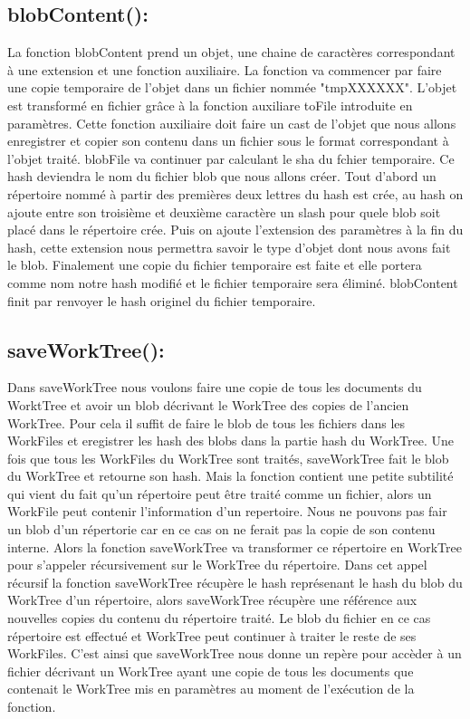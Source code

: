 \documentclass[12pt,francais]{article}
\begin{document}
\subsection{blobContent():}
	La fonction blobContent prend un objet, une chaine de caractères correspondant à une extension et une fonction auxiliaire. La fonction va commencer par faire une copie temporaire de l'objet dans un fichier nommée  "tmpXXXXXX".  L'objet est transformé en fichier grâce à la fonction auxiliare toFile introduite en paramètres. Cette fonction auxiliaire doit faire un cast de l'objet que nous allons enregistrer et copier son contenu dans un fichier sous le format correspondant à l'objet traité. blobFile va continuer par calculant le sha du fchier temporaire. Ce hash deviendra le nom du fichier blob que nous allons créer. Tout d'abord  un répertoire nommé à partir des premières deux lettres du hash est crée, au hash on ajoute entre son troisième et deuxième caractère un slash pour quele blob soit placé dans le répertoire crée. Puis on ajoute l'extension des paramètres à la fin du hash, cette extension nous permettra savoir le type d'objet dont nous avons fait le blob. Finalement une copie du fichier temporaire est faite et elle portera comme nom notre hash modifié et le fichier temporaire sera éliminé. blobContent finit par renvoyer le hash originel du fichier temporaire.
\subsection{saveWorkTree():}
	Dans saveWorkTree nous voulons faire une copie de tous les documents du WorktTree et avoir un blob décrivant le WorkTree des copies de l'ancien WorkTree. Pour cela il suffit de faire le blob de tous les fichiers dans les WorkFiles et eregistrer les hash des blobs dans la partie hash du WorkTree. Une fois que tous les WorkFiles du WorkTree sont traités, saveWorkTree fait le blob du WorkTree et retourne son hash.
	 Mais la fonction contient une petite subtilité qui vient du fait qu'un répertoire peut être traité comme un fichier, alors un WorkFile peut contenir l'information d'un repertoire. Nous ne pouvons pas fair un blob d'un répertorie car en ce cas on ne ferait pas la copie de son contenu interne. Alors la fonction saveWorkTree va transformer ce répertoire en WorkTree pour s'appeler récursivement sur le WorkTree du répertoire.  Dans cet appel récursif la fonction saveWorkTree récupère le hash représenant le hash du blob du WorkTree d'un répertoire, alors saveWorkTree récupère une référence aux nouvelles copies du contenu du répertoire traité. Le blob du fichier en ce cas répertoire est effectué et WorkTree peut continuer à traiter le reste de ses WorkFiles.
	 C'est ainsi que saveWorkTree nous donne un repère pour accèder à un fichier décrivant un WorkTree ayant une copie de tous les documents que contenait le WorkTree mis en paramètres au moment de l'exécution de la fonction.
	
\end{document}
